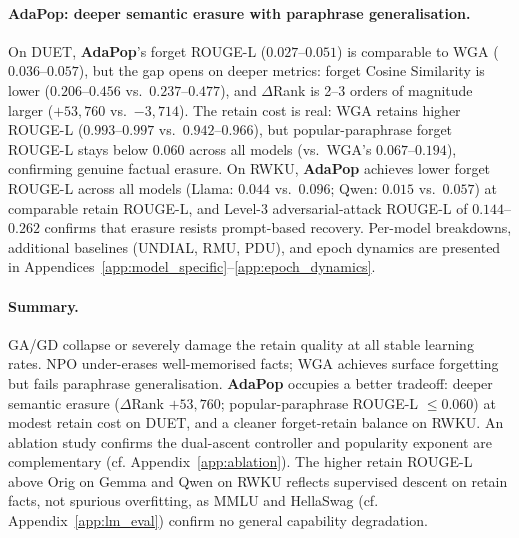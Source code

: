 \paragraph{\textbf{AdaPop}: deeper semantic erasure with paraphrase generalisation.}
On DUET, \textbf{AdaPop}'s forget ROUGE-L ($0.027$--$0.051$) is comparable to WGA ($0.036$--$0.057$), but the gap opens on deeper metrics: forget Cosine Similarity is lower ($0.206$--$0.456$ vs.\ $0.237$--$0.477$), and $\Delta$Rank is 2--3 orders of magnitude larger ($+53{,}760$ vs.\ $-3{,}714$). The retain cost is real: WGA retains higher ROUGE-L ($0.993$--$0.997$ vs.\ $0.942$--$0.966$), but popular-paraphrase forget ROUGE-L stays below $0.060$ across all models (vs.\ WGA's $0.067$--$0.194$), confirming genuine factual erasure. On RWKU, \textbf{AdaPop} achieves lower forget ROUGE-L across all models (Llama: $0.044$ vs.\ $0.096$; Qwen: $0.015$ vs.\ $0.057$) at comparable retain ROUGE-L, and Level-3 adversarial-attack ROUGE-L of $0.144$--$0.262$ confirms that erasure resists prompt-based recovery. Per-model breakdowns, additional baselines (UNDIAL, RMU, PDU), and epoch dynamics are presented in Appendices~\ref{app:model_specific}--\ref{app:epoch_dynamics}.

\paragraph{Summary.}
GA/GD collapse or severely damage the retain quality at all stable learning rates. NPO under-erases well-memorised facts; WGA achieves surface forgetting but fails paraphrase generalisation. \textbf{AdaPop} occupies a better tradeoff: deeper semantic erasure ($\Delta$Rank $+53{,}760$; popular-paraphrase ROUGE-L $\leq 0.060$) at modest retain cost on DUET, and a cleaner forget-retain balance on RWKU. An ablation study confirms the dual-ascent controller and popularity exponent are complementary (cf. Appendix~\ref{app:ablation}). The higher retain ROUGE-L above Orig on Gemma and Qwen on RWKU reflects supervised descent on retain facts, not spurious overfitting, as MMLU and HellaSwag (cf. Appendix~\ref{app:lm_eval}) confirm no general capability degradation.




